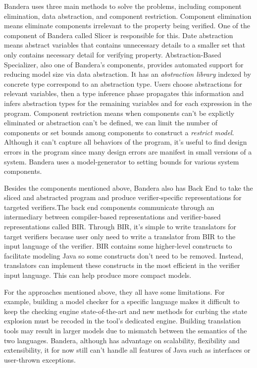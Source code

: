 \documentclass[acmsmall]{acmart}
\begin{document}
Bandera uses three main methods to solve the problems, including component elimination, data abstraction, and component restriction. Component elimination means eliminate components irrelevant to the property being verified. One of the component of Bandera called Slicer is responsible for this. Date abstraction means abstract variables that contains unnecessary details to a smaller set that only contains necessary detail for verifying property. Abstraction-Based Specializer, also one of Bandera's components, provides automated support for reducing model size via data abstraction. It has an {\itshape abstraction library} indexed by concrete type correspond to an abstraction type. Users choose abstractions for relevant variables, then a type inference phase propagates this information and infers abstraction types for the remaining variables and for each expression in the program. Component restriction means when components can't be explictly eliminated or abstraction can't be defined, we can limit the number of components or set bounds among components to construct a {\itshape restrict model}. Although it can't capture all behaviors of the program, it's useful to find design errors in the program since many design errors are manifest in small versions of a system. Bandera uses a model-generator to setting bounds for various system components.


Besides the components mentioned above, Bandera also has Back End to take the sliced and abstracted program and produce verifier-specific representations for targeted verifiers.The back end components communicate through an intermediary between compiler-based representations and 
verifier-based representations called BIR. Through BIR, it's simple to  write translators for target verifiers because user only need to write a translator from BIR to the input language of the verifier. BIR contains some higher-level constructs to facilitate modeling Java so some constructs don't need to be removed. Instead, translators can implement these constructs in the most efficient in the verifier input language. This can help produce more compact models.


For the approaches mentioned above, they all have some limitations. For example, building a model checker for a specific language makes it difficult to keep the checking engine state-of-the-art and new methods for curbing the state explosion must be recoded in the tool’s dedicated engine\cite{corbett2000bandera}. Building translation tools may result in larger models due to mismatch between the semantics of the two languages. Bandera, although has advantage on scalability, flexibility and extensibility, it for now still can't handle all features of Java such as  interfaces or user-thrown exceptions.
\end{document}
